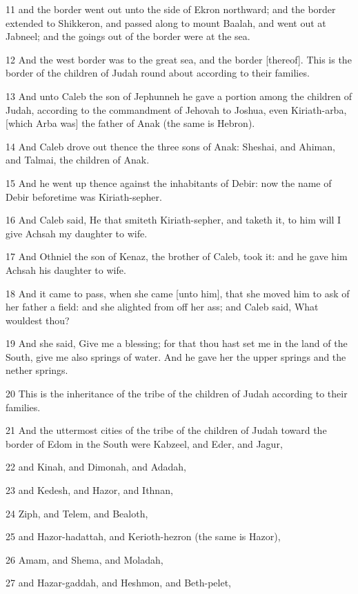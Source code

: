\par 11 and the border went out unto the side of Ekron northward; and the border extended to Shikkeron, and passed along to mount Baalah, and went out at Jabneel; and the goings out of the border were at the sea.
\par 12 And the west border was to the great sea, and the border [thereof]. This is the border of the children of Judah round about according to their families.
\par 13 And unto Caleb the son of Jephunneh he gave a portion among the children of Judah, according to the commandment of Jehovah to Joshua, even Kiriath-arba, [which Arba was] the father of Anak (the same is Hebron).
\par 14 And Caleb drove out thence the three sons of Anak: Sheshai, and Ahiman, and Talmai, the children of Anak.
\par 15 And he went up thence against the inhabitants of Debir: now the name of Debir beforetime was Kiriath-sepher.
\par 16 And Caleb said, He that smiteth Kiriath-sepher, and taketh it, to him will I give Achsah my daughter to wife.
\par 17 And Othniel the son of Kenaz, the brother of Caleb, took it: and he gave him Achsah his daughter to wife.
\par 18 And it came to pass, when she came [unto him], that she moved him to ask of her father a field: and she alighted from off her ass; and Caleb said, What wouldest thou?
\par 19 And she said, Give me a blessing; for that thou hast set me in the land of the South, give me also springs of water. And he gave her the upper springs and the nether springs.
\par 20 This is the inheritance of the tribe of the children of Judah according to their families.
\par 21 And the uttermost cities of the tribe of the children of Judah toward the border of Edom in the South were Kabzeel, and Eder, and Jagur,
\par 22 and Kinah, and Dimonah, and Adadah,
\par 23 and Kedesh, and Hazor, and Ithnan,
\par 24 Ziph, and Telem, and Bealoth,
\par 25 and Hazor-hadattah, and Kerioth-hezron (the same is Hazor),
\par 26 Amam, and Shema, and Moladah,
\par 27 and Hazar-gaddah, and Heshmon, and Beth-pelet,
